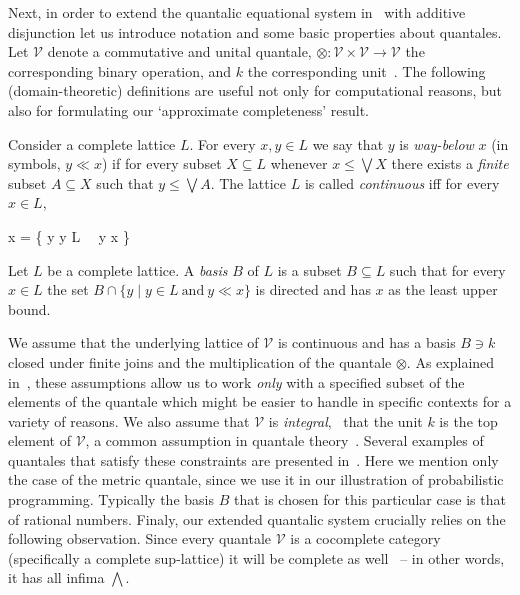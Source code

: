 \documentclass[a4paper,UKenglish,cleveref, autoref, thm-restate]{lipics-v2021}
\begin{document}
Next, in order to extend the quantalic equational system
in~\cite{dahlqvist22,dahlqvist2023syntactic} with additive disjunction let us
introduce notation and some basic properties about quantales.  Let
$\mathcal{V}$ denote a commutative and unital quantale, $\otimes : \mathcal{V}
\times \mathcal{V} \to \mathcal{V}$ the corresponding binary operation, and $k$
the corresponding unit~\cite{paseka00}.  The following (domain-theoretic)
definitions are useful not only for computational reasons, but also for
formulating our `approximate completeness' result.
\begin{definition}
	Consider a complete lattice $L$.  For every $x, y \in L$ we say that
	$y$ is \emph{way-below} $x$ (in symbols, $y \ll x$) if for every
	subset $X \subseteq L$ whenever $x \leq \bigvee X$ there exists a
	\emph{finite} subset $A \subseteq X$ such that $y \leq \bigvee A$.
	The lattice $L$ is called \emph{continuous} iff for every $x \in L$,
	\begin{flalign*}
		x = \bigvee \{ y  \mid y \in L\  \ y \ll x \}
	\end{flalign*}
\end{definition}

\begin{definition}
	Let $L$ be a complete lattice. A \emph{basis} $B$ of $L$ is a subset
	$B \subseteq L$ such that for every $x \in L$ the set
	$B \cap \{ y \mid y \in L\ \text{and} \ y \ll x \}$ is directed and
	has $x$ as the least upper bound.
\end{definition}
We assume that the underlying lattice of $\mathcal{V}$ is continuous and has a
basis $B \ni k$ closed under finite joins and the multiplication of the
quantale $\otimes$. As explained in~\cite{dahlqvist22,dahlqvist2023syntactic},
these assumptions allow us to work \emph{only} with a specified subset of the
elements of the quantale which might be easier to handle in specific contexts
for a variety of reasons.  We also assume that $\mathcal{V}$ is
\emph{integral}, \ie\ that the unit $k$ is the top element of $\mathcal{V}$, a
common assumption in quantale theory~\cite{velebil19}. Several examples of
quantales that satisfy these constraints are presented
in~\cite{dahlqvist22,dahlqvist2023syntactic}. Here we mention only the case of
the metric quantale, since we use it in our illustration of probabilistic
programming. Typically the basis $B$ that is chosen for this particular case is
that of rational numbers.  Finaly, our extended quantalic system crucially
relies on the following observation.  Since every quantale $\mathcal{V}$ is a
cocomplete category (specifically a complete sup-lattice) it will be complete
as well~\cite[Section 12]{cats} -- in other words, it has all infima
$\bigwedge$. 
\end{document}
